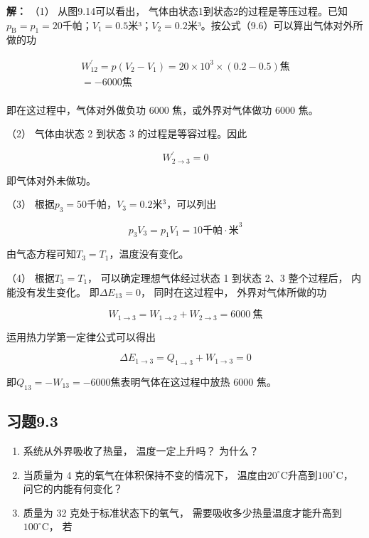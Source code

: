 \textbf{解：} （1） 从图9.14可以看出，
气体由状态1到状态2的过程是等压过程。已知\(p_{\mathrm{B}} = p_{1} = 20\)千帕；\(V_{1} = 0.5\)米³；\(V_{2} = 0.2\)米³。按公式（9.6）可以算出气体对外所做的功

\[
\begin{array}{l} W _ {12} ^ {\prime} = p (V _ {2} - V _ {1}) = 20 \times 10 ^ {3} \times (0.2 - 0.5) \text{焦} \\ = - 6000 \text{焦} \\ \end{array}
\]

即在这过程中，气体对外做负功 6000 焦，或外界对气体做功 6000 焦。

（2） 气体由状态 2 到状态 3 的过程是等容过程。因此

\[
W_{2\to3}^\prime=0
\]

即气体对外未做功。

（3） 根据\(p_{3}=50\)千帕，\(V_{3}=0.2\)米\(^{3}\)，可以列出

\[
p _ {3} V _ {3} = p _ {1} V _ {1} = 10 \text{千帕} \cdot \text{米} ^ {3}
\]

由气态方程可知\(T_{3} = T_{1}\)，温度没有变化。

（4） 根据\(T_{3} = T_{1}\)， 可以确定理想气体经过状态 1 到状态 2、3
整个过程后， 内能没有发生变化。 即\(\Delta E_{13} = 0\)，
同时在这过程中， 外界对气体所做的功

\[
W_{1\to3}=W_{1\to2}+W_{2\to3}=6000\ \text{焦}
\]

运用热力学第一定律公式可以得出

\[
\Delta E_{1\to3}=Q_{1\to3}+W_{1\to3}=0
\]

即\(Q_{13} = -W_{13} = -6000\)焦表明气体在这过程中放热 6000 焦。

\subsection{习题9.3}\label{ux4e60ux98989.3}

\begin{enumerate}
\def\labelenumi{\arabic{enumi}.}
\item
  系统从外界吸收了热量， 温度一定上升吗？ 为什么？
\item
  当质量为 4 克的氧气在体积保持不变的情况下，
  温度由\(20^{\circ} \mathrm{C}\)升高到\(100^{\circ} \mathrm{C}\)，
  问它的内能有何变化？
\item
  质量为 32 克处于标准状态下的氧气，
  需要吸收多少热量温度才能升高到\(100^{\circ} \mathrm{C}\)， 若
\end{enumerate}

